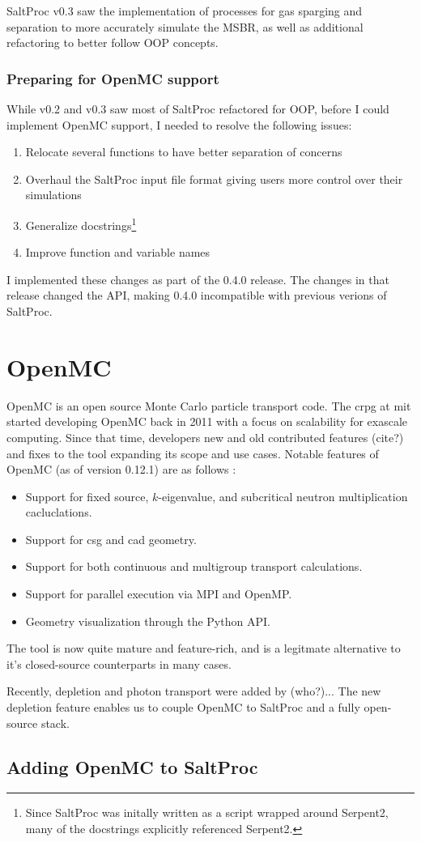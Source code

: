 SaltProc v0.3 saw the implementation of processes for gas sparging and separation to more accurately simulate the MSBR, as well as additional refactoring to better follow OOP concepts.

\subsubsection{Preparing for OpenMC support}%
While v0.2 and v0.3 saw most of SaltProc refactored for OOP, before I could implement OpenMC support, I needed to resolve the following issues:
\begin{enumerate}
    \item Relocate several functions to have better separation of concerns
    \item Overhaul the SaltProc input file format giving users more control over their simulations
    \item Generalize docstrings\footnote{Since SaltProc was initally written as a script wrapped around Serpent2, many of the docstrings explicitly referenced Serpent2.}
    \item Improve function and variable names
\end{enumerate}
I implemented these changes as part of the 0.4.0 release. The changes in that release changed the API, making 0.4.0 incompatible with previous verions of SaltProc.

\section{OpenMC}%
\label{sub:openmc}

OpenMC \cite{romano_openmc_2015} is an open source Monte Carlo particle transport code. The \Gls{crpg} at \Gls{mit} started developing OpenMC back in 2011 with a focus on scalability for exascale computing. Since that time, developers new and old contributed features (cite?) and fixes to the tool expanding its scope and use cases. Notable features of OpenMC (as of version 0.12.1) are as follows \cite{homepage_openmc_2022}:
\begin{itemize}
    \item Support for fixed source, $k$-eigenvalue, and subcritical neutron multiplication cacluclations.
    \item Support for \Gls{csg} and \Gls{cad} geometry.
    \item Support for both continuous and multigroup transport calculations.
    \item Support for parallel execution via MPI and OpenMP.
    \item Geometry visualization through the Python API.
\end{itemize}
The tool is now quite mature and feature-rich, and is a legitmate alternative to it's closed-source counterparts in many cases.

Recently, depletion and photon transport were added by (who?)... The new depletion feature enables us to couple OpenMC to SaltProc and a fully open-source stack.

\subsection{Adding OpenMC to SaltProc}%
\label{sub:adding_openmc_to_saltproc}
